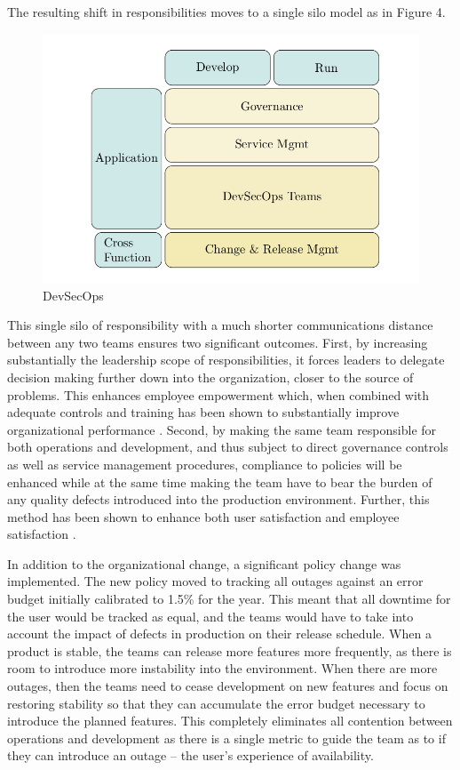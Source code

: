\documentclass[doc]{apa7}
\begin{document}
The resulting shift in responsibilities moves to a single silo model as in Figure 4.

\begin{figure}[htbp]
\centering
\includegraphics[width=.9\linewidth]{./diag4.png}
\caption{DevSecOps}
\end{figure}

This single silo of responsibility with a much shorter communications distance between any two teams ensures two significant outcomes. First, by increasing substantially the leadership scope of responsibilities, it forces leaders to delegate decision making further down into the organization, closer to the source of problems. This enhances employee empowerment which, when combined with adequate controls and training has been shown to substantially improve organizational performance  \citep{bairdRelationshipEnablingUse2018,al-omariRoleEmpowermentImproving2020}. Second, by making the same team responsible for both operations and development, and thus subject to direct governance controls as well as service management procedures, compliance to policies will be enhanced while at the same time making the team have to bear the burden of any quality defects introduced into the production environment. Further, this method has been shown to enhance both user satisfaction and employee satisfaction \citep[Sec. 4.3]{altContinuousInnovationDevOps} .

In addition to the organizational change, a significant policy change was implemented. The new policy moved to tracking all outages against an error budget initially calibrated to 1.5\% for the year. This meant that all downtime for the user would be tracked as equal, and the teams would have to take into account the impact of defects in production on their release schedule. When a product is stable, the teams can release more features more frequently, as there is room to introduce more instability into the environment. When there are more outages, then the teams need to cease development on new features and focus on restoring stability so that they can accumulate the error budget necessary to introduce the planned features. This completely eliminates all contention between operations and development as there is a single metric to guide the team as to if they can introduce an outage -- the user's experience of availability.
\end{document}

